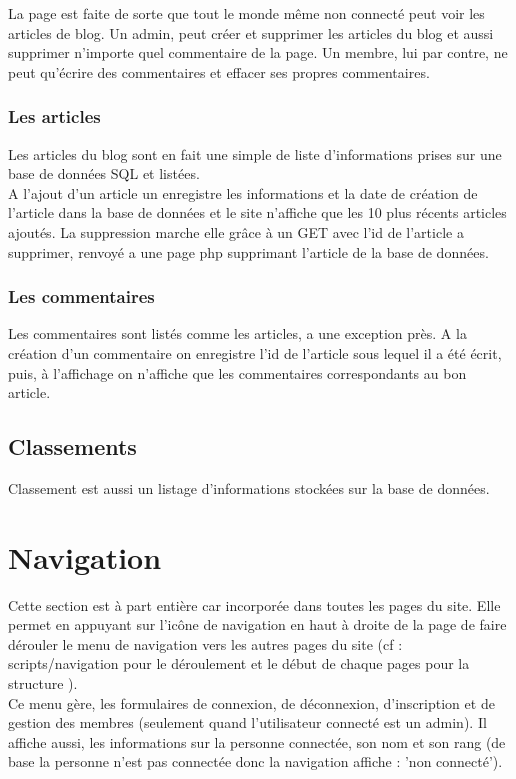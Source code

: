 \documentclass{article}
\begin{document}
La page est faite de sorte que tout le monde même non connecté peut voir les articles de blog. Un admin, peut créer et supprimer les articles du blog et aussi supprimer n'importe quel commentaire de la page. Un membre, lui par contre, ne peut qu'écrire des commentaires et effacer ses propres commentaires.

\subsubsection{Les articles}
Les articles du blog sont en fait une simple de liste d'informations prises sur une base de données SQL et listées.\\
A l'ajout d'un article un enregistre les informations et la date de création de l'article dans la base de données et le site n'affiche que les 10 plus récents articles ajoutés.
La suppression marche elle grâce à un GET avec l'id de l'article a supprimer, renvoyé a une page php supprimant l'article de la base de données.

\subsubsection{Les commentaires}
Les commentaires sont listés comme les articles, a une exception près. A la création d'un commentaire on enregistre l'id de l'article sous lequel il a été écrit, puis, à l'affichage on n'affiche que les commentaires correspondants au bon article. 

\subsection{Classements}
Classement est aussi un listage d'informations stockées sur la base de données. 

\section{Navigation}

Cette section est à part entière car incorporée dans toutes les pages du site. Elle permet en appuyant sur l'icône de navigation en haut à droite de la page de faire dérouler le menu de navigation vers les autres pages du site (cf : scripts/navigation pour le déroulement et le début de chaque pages pour la structure ).\\

Ce menu gère, les formulaires de connexion, de déconnexion, d'inscription et de gestion des membres (seulement quand l'utilisateur connecté est un admin). Il affiche aussi, les informations sur la personne connectée, son nom et son rang (de base la personne n'est pas connectée donc la navigation affiche : 'non connecté').
\end{document}
